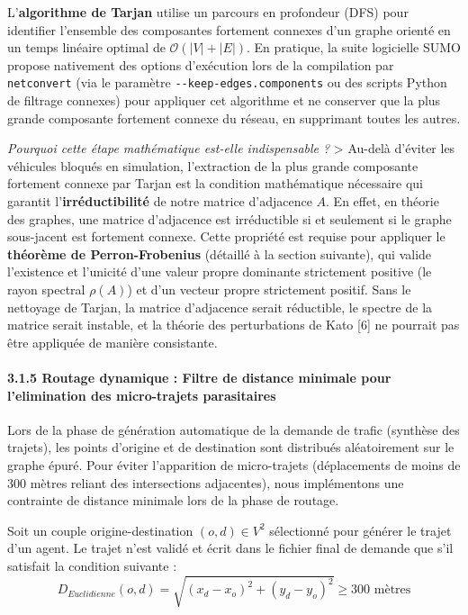 \documentclass[10pt, a4paper]{article}
\begin{document}
L'\textbf{algorithme de Tarjan} utilise un parcours en profondeur (DFS)
pour identifier l'ensemble des composantes fortement connexes d'un
graphe orienté en un temps linéaire optimal de
\(\mathcal{O}(|V| + |E|)\). En pratique, la suite logicielle SUMO
propose nativement des options d'exécution lors de la compilation par
\texttt{netconvert} (via le paramètre \texttt{-\/-keep-edges.components}
ou des scripts Python de filtrage connexes) pour appliquer cet
algorithme et ne conserver que la plus grande composante fortement
connexe du réseau, en supprimant toutes les autres.

\emph{Pourquoi cette étape mathématique est-elle indispensable ?}
\textgreater{} Au-delà d'éviter les véhicules bloqués en simulation,
l'extraction de la plus grande composante fortement connexe par Tarjan
est la condition mathématique nécessaire qui garantit
l'\textbf{irréductibilité} de notre matrice d'adjacence \(A\). En effet,
en théorie des graphes, une matrice d'adjacence est irréductible si et
seulement si le graphe sous-jacent est fortement connexe. Cette
propriété est requise pour appliquer le \textbf{théorème de
Perron-Frobenius} (détaillé à la section suivante), qui valide
l'existence et l'unicité d'une valeur propre dominante strictement
positive (le rayon spectral \(\rho(A)\)) et d'un vecteur propre
strictement positif. Sans le nettoyage de Tarjan, la matrice d'adjacence
serait réductible, le spectre de la matrice serait instable, et la
théorie des perturbations de Kato {[}6{]} ne pourrait pas être appliquée
de manière consistante.

\paragraph{3.1.5 Routage dynamique : Filtre de distance minimale pour
l'elimination des micro-trajets
parasitaires}\label{routage-dynamique-filtre-de-distance-minimale-pour-lelimination-des-micro-trajets-parasitaires}

Lors de la phase de génération automatique de la demande de trafic
(synthèse des trajets), les points d'origine et de destination sont
distribués aléatoirement sur le graphe épuré. Pour éviter l'apparition
de micro-trajets (déplacements de moins de 300 mètres reliant des
intersections adjacentes), nous implémentons une contrainte de distance
minimale lors de la phase de routage.

Soit un couple origine-destination \((o, d) \in V^2\) sélectionné pour
générer le trajet d'un agent. Le trajet n'est validé et écrit dans le
fichier final de demande que s'il satisfait la condition suivante :
\[D_{Euclidienne}(o, d) = \sqrt{(x_d - x_o)^2 + (y_d - y_o)^2} \ge 300 \text{ mètres}\]
\end{document}
